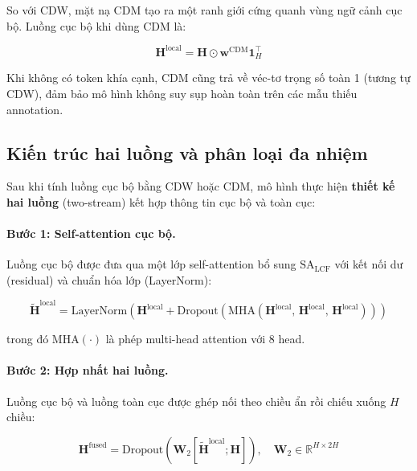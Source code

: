So với CDW, mặt nạ CDM tạo ra một ranh giới cứng quanh vùng ngữ cảnh
cục bộ. Luồng cục bộ khi dùng CDM là:

\begin{equation}
  \mathbf{H}^{\mathrm{local}} = \mathbf{H} \odot
    \mathbf{w}^{\mathrm{CDM}} \mathbf{1}_{H}^{\top}
  \label{eq:local_cdm}
\end{equation}

Khi không có token khía cạnh, CDM cũng trả về véc-tơ trọng số toàn 1
(tương tự CDW), đảm bảo mô hình không suy sụp hoàn toàn trên các mẫu
thiếu annotation.

\subsection{Kiến trúc hai luồng và phân loại đa nhiệm}
\label{subsec:two_stream}

Sau khi tính luồng cục bộ bằng CDW hoặc CDM, mô hình thực hiện
\textbf{thiết kế hai luồng} (two-stream) kết hợp thông tin cục bộ
và toàn cục:

\paragraph{Bước 1: Self-attention cục bộ.}
Luồng cục bộ được đưa qua một lớp self-attention bổ sung
$\mathrm{SA}_{\mathrm{LCF}}$ với kết nối dư (residual) và
chuẩn hóa lớp (LayerNorm):

\begin{equation}
  \widetilde{\mathbf{H}}^{\mathrm{local}} =
    \mathrm{LayerNorm}\!\left(
      \mathbf{H}^{\mathrm{local}} +
      \mathrm{Dropout}\!\left(
        \mathrm{MHA}\!\left(
          \mathbf{H}^{\mathrm{local}},\,
          \mathbf{H}^{\mathrm{local}},\,
          \mathbf{H}^{\mathrm{local}}
        \right)
      \right)
    \right)
  \label{eq:sa_lcf}
\end{equation}

\noindent trong đó $\mathrm{MHA}(\cdot)$ là phép multi-head attention
với 8 head.

\paragraph{Bước 2: Hợp nhất hai luồng.}
Luồng cục bộ và luồng toàn cục được ghép nối theo chiều ẩn rồi chiếu
xuống $H$ chiều:

\begin{equation}
  \mathbf{H}^{\mathrm{fused}} = \mathrm{Dropout}\!\left(
    \mathbf{W}_2 \left[
      \widetilde{\mathbf{H}}^{\mathrm{local}};
      \mathbf{H}
    \right]
  \right), \quad \mathbf{W}_2 \in \mathbb{R}^{H \times 2H}
  \label{eq:fusion}
\end{equation}

